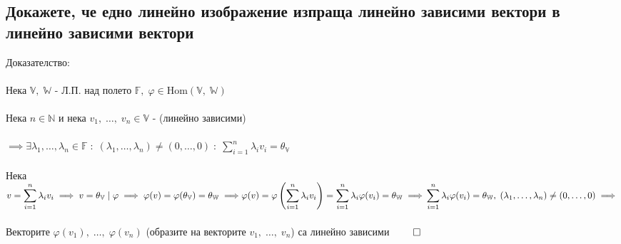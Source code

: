 \documentclass{article}
\newcommand{\V}{\mathbb{V}}
\newcommand{\N}{\mathbb{N}}
\newcommand{\F}{\mathbb{F}}
\newcommand{\W}{\mathbb{W}}
\newcommand{\n}[1]{#1_1, \dots, #1_n}
\newcommand{\OV}{\theta}
\begin{document}
    \subsection{Докажете, че едно линейно изображение изпраща линейно зависими вектори в линейно зависими вектори}
    Доказателство: \\\\
    Нека \(\V, \; \W\) - Л.П. над полето \(\F, \; \varphi \in \mathrm{Hom}(\V, \; \W)\) \\\\
    Нека \(n \in \N\) и нека \(v_1, \; \dots, \; v_n \in \V\) - (линейно зависими) \\\\
    \(\implies \exists \n{\lambda} \in \F \; : \;  (\n{\lambda}) \neq (0, \dots, 0) \; : \; \displaystyle\sum_{i = 1}^n \lambda_i v_i = \OV_\V\) \\\\
    Нека \(v = \displaystyle\sum_{i = 1}^n \lambda_i v_i \implies v = \OV_\V \; | \;\varphi
    \implies \varphi(v) = \varphi(\OV_\V) = \OV_\W \implies \\\\
    \varphi(v) = \varphi\left(\displaystyle\sum_{i = 1}^n \lambda_i v_i\right) = \displaystyle\sum_{i = 1}^n \lambda_i \varphi(v_i) = \OV_\W \implies \\\\
    \displaystyle\sum_{i = 1}^n \lambda_i \varphi(v_i) = \OV_\W, \; (\n{\lambda}) \neq (0, \dots, 0) \implies \) \\\\
    Векторите \(\varphi(v_1), \; \dots, \; \varphi(v_n)\) (образите на векторите \(v_1, \; \dots, \; v_n\))
    са линейно зависими \(\qed\) 
\end{document}
